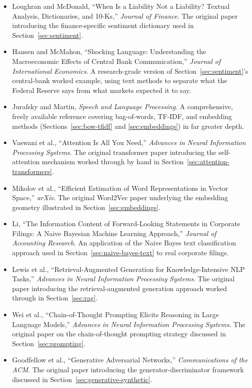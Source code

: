 \documentclass[../ai_in_finance]{subfiles}
\begin{document}
\begin{itemize}
    \item Loughran and McDonald, ``When Is a Liability Not a Liability? Textual Analysis, Dictionaries, and 10-Ks,'' \emph{Journal of Finance}. The original paper introducing the finance-specific sentiment dictionary used in Section~\ref{sec:sentiment}.
    \item Hansen and McMahon, ``Shocking Language: Understanding the Macroeconomic Effects of Central Bank Communication,'' \emph{Journal of International Economics}. A research-grade version of Section~\ref{sec:sentiment}'s central-bank worked example, using text methods to separate what the Federal Reserve says from what markets expected it to say.
    \item Jurafsky and Martin, \emph{Speech and Language Processing}. A comprehensive, freely available reference covering bag-of-words, TF-IDF, and embedding methods (Sections~\ref{sec:bow-tfidf} and \ref{sec:embeddings}) in far greater depth.
    \item Vaswani et al., ``Attention Is All You Need,'' \emph{Advances in Neural Information Processing Systems}. The original transformer paper introducing the self-attention mechanism worked through by hand in Section~\ref{sec:attention-transformers}.
    \item Mikolov et al., ``Efficient Estimation of Word Representations in Vector Space,'' \emph{arXiv}. The original Word2Vec paper underlying the embedding geometry illustrated in Section~\ref{sec:embeddings}.
    \item Li, ``The Information Content of Forward-Looking Statements in Corporate Filings: A Naive Bayesian Machine Learning Approach,'' \emph{Journal of Accounting Research}. An application of the Naive Bayes text classification approach used in Section~\ref{sec:naive-bayes-text} to real corporate filings.
    \item Lewis et al., ``Retrieval-Augmented Generation for Knowledge-Intensive NLP Tasks,'' \emph{Advances in Neural Information Processing Systems}. The original paper introducing the retrieval-augmented generation approach worked through in Section~\ref{sec:rag}.
    \item Wei et al., ``Chain-of-Thought Prompting Elicits Reasoning in Large Language Models,'' \emph{Advances in Neural Information Processing Systems}. The original paper on the chain-of-thought prompting strategy discussed in Section~\ref{sec:prompting}.
    \item Goodfellow et al., ``Generative Adversarial Networks,'' \emph{Communications of the ACM}. The original paper introducing the generator-discriminator framework discussed in Section~\ref{sec:generative-synthetic}.

\end{itemize}
\end{document}
